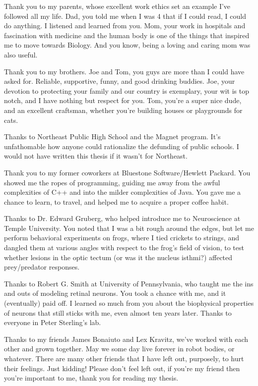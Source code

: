 \documentclass{ucbthesis}
\begin{document}
\begin{frontmatter}

\begin{acknowledgements}

Thank you to my parents, whose excellent work ethics set an example I've followed all my life. Dad, you told me when I was 4 that if I could read, I could do anything. I listened and learned from you. Mom, your work in hospitals and fascination with medicine and the human body is one of the things that inspired me to move towards Biology. And you know, being a loving and caring mom was also useful. 

Thank you to my brothers. Joe and Tom, you guys are more than I could have asked for. Reliable, supportive, funny, and good drinking buddies. Joe, your devotion to protecting your family and our country is exemplary, your wit is top notch, and I have nothing but respect for you. Tom, you're a super nice dude, and an excellent craftsman, whether you're building houses or playgrounds for cats.

Thanks to Northeast Public High School and the Magnet program. It's unfathomable how anyone could rationalize the defunding of public schools. I would not have written this thesis if it wasn't for Northeast.

Thank you to my former coworkers at Bluestone Software/Hewlett Packard. You showed me the ropes of programming, guiding me away from the awful complexities of C++ and into the milder complexities of Java. You gave me a chance to learn, to travel, and helped me to acquire a proper coffee habit.

Thanks to Dr. Edward Gruberg, who helped introduce me to Neuroscience at Temple University. You noted that I was a bit rough around the edges, but let me perform behavioral experiments on frogs, where I tied crickets to strings, and dangled them at various angles with respect to the frog's field of vision, to test whether lesions in the optic tectum (or was it the nucleus isthmi?) affected prey/predator responses.

Thanks to Robert G. Smith at University of Pennsylvania, who taught me the ins and outs of modeling retinal neurons. You took a chance with me, and it (eventually) paid off. I learned so much from you about the biophysical properties of neurons that still sticks with me, even almost ten years later. Thanks to everyone in Peter Sterling's lab.

Thanks to my friends James Bonaiuto and Lex Kravitz, we've worked with each other and grown together. May we some day live forever in robot bodies, or whatever. There are many other friends that I have left out, purposely, to hurt their feelings. Just kidding! Please don't feel left out, if you're my friend then you're important to me, thank you for reading my thesis.


\end{acknowledgements}
\end{frontmatter}
\end{document}
